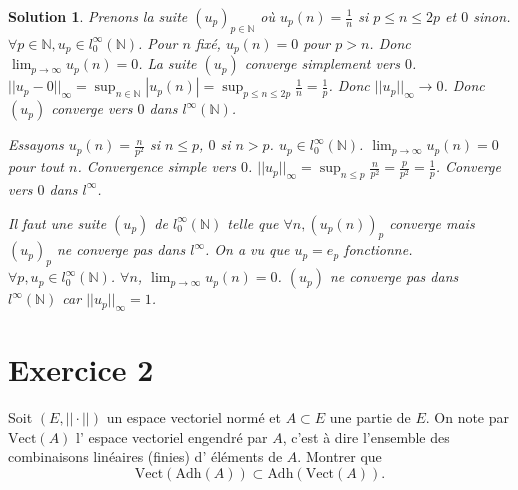 \documentclass{article}
\newtheorem{solution}{Solution}
\begin{document}
\begin{solution}
Prenons la suite $(u_p)_{p \in \mathbb{N}}$ où $u_p(n) = \frac{1}{n}$ si $p \le n \le 2p$ et $0$ sinon.
$\forall p \in \mathbb{N}, u_p \in l_0^\infty(\mathbb{N})$.
Pour $n$ fixé, $u_p(n) = 0$ pour $p > n$. Donc $\lim_{p \to \infty} u_p(n) = 0$. La suite $(u_p)$ converge simplement vers $0$.
$||u_p - 0||_\infty = \sup_{n \in \mathbb{N}} |u_p(n)| = \sup_{p \le n \le 2p} \frac{1}{n} = \frac{1}{p}$.
Donc $||u_p||_\infty \to 0$. Donc $(u_p)$ converge vers $0$ dans $l^\infty(\mathbb{N})$.

Essayons $u_p(n) = \frac{n}{p^2}$ si $n \le p$, $0$ si $n > p$.
$u_p \in l_0^\infty(\mathbb{N})$.
$\lim_{p \to \infty} u_p(n) = 0$ pour tout $n$. Convergence simple vers $0$.
$||u_p||_\infty = \sup_{n \le p} \frac{n}{p^2} = \frac{p}{p^2} = \frac{1}{p}$.
Converge vers $0$ dans $l^\infty$.

Il faut une suite $(u_p)$ de $l_0^\infty(\mathbb{N})$ telle que $\forall n, (u_p(n))_{p}$ converge mais $(u_p)_p$ ne converge pas dans $l^\infty$.
On a vu que $u_p = e_p$ fonctionne.
$\forall p, u_p \in l_0^\infty(\mathbb{N})$.
$\forall n$, $\lim_{p \to \infty} u_p(n) = 0$.
$(u_p)$ ne converge pas dans $l^\infty(\mathbb{N})$ car $||u_p||_\infty = 1$.
\end{solution}

\section*{Exercice 2}
Soit $(E, || \cdot ||)$ un espace vectoriel normé et $A \subset E$ une partie de $E$. On note par $\text{Vect}(A)$ l' espace vectoriel engendré par $A$, c'est à dire l'ensemble des combinaisons linéaires (finies) d' éléments de $A$. Montrer que
\[ \text{Vect}(\text{Adh}(A)) \subset \text{Adh}(\text{Vect}(A)). \]
\end{document}
